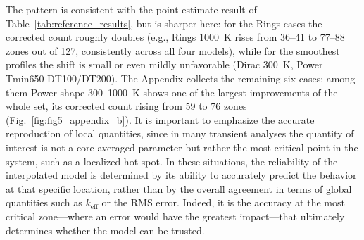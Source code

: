 \documentclass{style/nseJournal}
\begin{document}
The pattern is consistent with the point-estimate result of Table~\ref{tab:reference_results}, but is sharper here: for the Rings cases the corrected count roughly doubles (e.g., Rings 1000~K rises from 36--41 to 77--88 zones out of 127, consistently across all four models), while for the smoothest profiles the shift is small or even mildly unfavorable (Dirac 300~K, Power Tmin650 DT100/DT200). The Appendix collects the remaining six cases; among them Power shape 300--1000~K shows one of the largest improvements of the whole set, its corrected count rising from 59 to 76 zones (Fig.~\ref{fig:fig5_appendix_b}). It is important to emphasize the accurate reproduction of local quantities, since in many transient analyses the quantity of interest is not a core-averaged parameter but rather the most critical point in the system, such as a localized hot spot. In these situations, the reliability of the interpolated model is determined by its ability to accurately predict the behavior at that specific location, rather than by the overall agreement in terms of global quantities such as $k_{\text{eff}}$ or the RMS error. Indeed, it is the accuracy at the most critical zone—where an error would have the greatest impact—that ultimately determines whether the model can be trusted.
\end{document}
